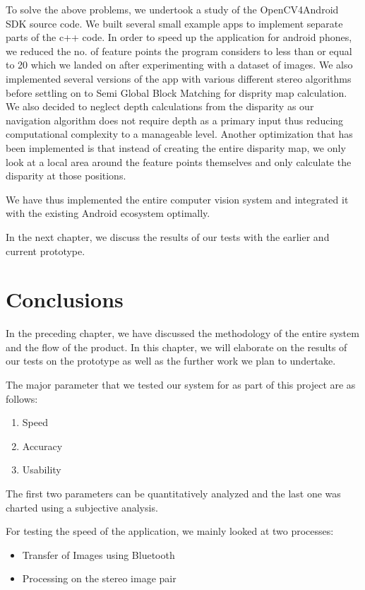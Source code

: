 \documentclass[11pt]{report}
\begin{document}
{{To solve the above problems, we undertook a study of the OpenCV4Android SDK source code. We built several small example apps to implement separate parts of the c++ code. In order to speed up the application for android phones, we reduced the no. of feature points the program considers to less than or equal to 20 which we landed on after experimenting with a dataset of images. We also implemented several versions of the app with various different stereo algorithms before settling on to Semi Global Block Matching for disprity map calculation. We also decided to neglect depth calculations from the disparity as our navigation algorithm does not require depth as a primary input thus reducing computational complexity to a manageable level. Another optimization that has been implemented is that instead of creating the entire disparity map, we only look at a local area around the feature points themselves and only calculate the disparity at those positions. 

We have thus implemented the entire computer vision system and integrated it with the existing Android ecosystem optimally.    

In the next chapter, we discuss the results of our tests with the earlier and current prototype. 

\chapter{Conclusions}

In the preceding chapter, we have discussed the methodology of the entire system and the flow of the product. In this chapter, we will elaborate on the results of our tests on the prototype as well as the further work we plan to undertake. 

The major parameter that we tested our system for as part of this project are as follows:

\begin{enumerate}
\item Speed 
\item Accuracy 
\item Usability 
\end{enumerate}

The first two parameters can be quantitatively analyzed and the last one was charted using  a subjective analysis. 

For testing the speed of the application, we mainly looked at two processes:
\begin{itemize}
\item Transfer of Images using Bluetooth
\item Processing on the stereo image pair
\end{itemize}

}}
\end{document}
